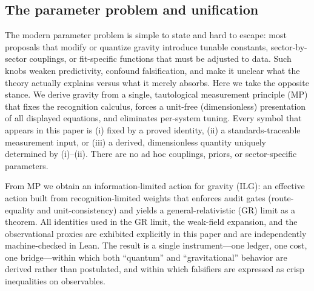 \documentclass[12pt,a4paper]{article}
\begin{document}
\subsection{The parameter problem and unification}
The modern parameter problem is simple to state and hard to escape: most proposals that modify or quantize gravity introduce tunable constants, sector-by-sector couplings, or fit-specific functions that must be adjusted to data. Such knobs weaken predictivity, confound falsification, and make it unclear what the theory actually explains versus what it merely absorbs. Here we take the opposite stance. We derive gravity from a single, tautological measurement principle (MP) that fixes the recognition calculus, forces a unit-free (dimensionless) presentation of all displayed equations, and eliminates per-system tuning. Every symbol that appears in this paper is (i) fixed by a proved identity, (ii) a standards-traceable measurement input, or (iii) a derived, dimensionless quantity uniquely determined by (i)–(ii). There are no ad hoc couplings, priors, or sector-specific parameters.

From MP we obtain an information-limited action for gravity (ILG): an effective action built from recognition-limited weights that enforces audit gates (route-equality and unit-consistency) and yields a general-relativistic (GR) limit as a theorem. All identities used in the GR limit, the weak-field expansion, and the observational proxies are exhibited explicitly in this paper and are independently machine-checked in Lean. The result is a single instrument—one ledger, one cost, one bridge—within which both “quantum” and “gravitational” behavior are derived rather than postulated, and within which falsifiers are expressed as crisp inequalities on observables.
\end{document}
